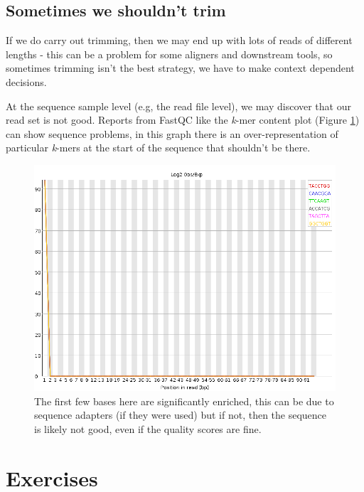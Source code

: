 \documentclass[12pt,]{book}
\theoremstyle{definition}
\theoremstyle{definition}
\theoremstyle{remark}
\begin{document}
\subsection{Sometimes we shouldn't
trim}\label{sometimes-we-shouldnt-trim}

If we do carry out trimming, then we may end up with lots of reads of
different lengths - this can be a problem for some aligners and
downstream tools, so sometimes trimming isn't the best strategy, we have
to make context dependent decisions.

At the sequence sample level (e.g, the read file level), we may discover
that our read set is not good. Reports from FastQC like the \emph{k}-mer
content plot (Figure \ref{fig:kmer}) can show sequence problems, in this
graph there is an over-representation of particular \emph{k}-mers at the
start of the sequence that shouldn't be there.





\begin{figure}
\includegraphics[width=5.33in]{assets/kmer_content} \caption{The first few bases here are significantly enriched, this
can be due to sequence adapters (if they were used) but if not, then the
sequence is likely not good, even if the quality scores are fine.}\label{fig:kmer}
\end{figure}

\section{Exercises}\label{exercises}
\end{document}
